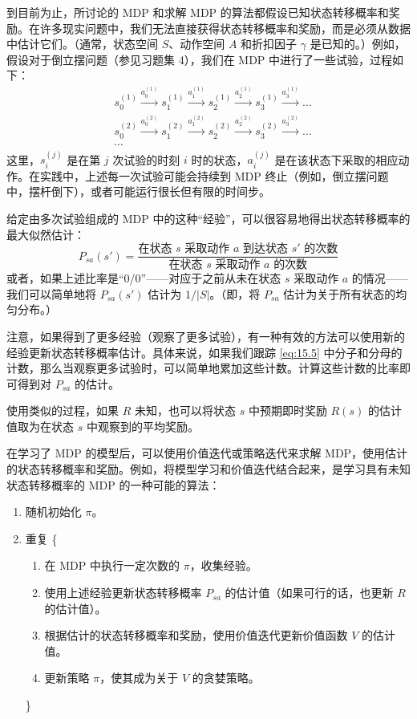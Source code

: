 到目前为止，所讨论的 MDP 和求解 MDP 的算法都假设已知状态转移概率和奖励。在许多现实问题中，我们无法直接获得状态转移概率和奖励，而是必须从数据中估计它们。（通常，状态空间 $S$、动作空间 $A$ 和折扣因子 $\gamma$ 是已知的。）例如，假设对于倒立摆问题（参见习题集 4），我们在 MDP 中进行了一些试验，过程如下：
\begin{align*}
    &s_0^{(1)} \xrightarrow{a_0^{(1)}} s_1^{(1)} \xrightarrow{a_1^{(1)}} s_2^{(1)} \xrightarrow{a_2^{(1)}} s_3^{(1)} \xrightarrow{a_3^{(1)}} \dots \\
    &s_0^{(2)} \xrightarrow{a_0^{(2)}} s_1^{(2)} \xrightarrow{a_1^{(2)}} s_2^{(2)} \xrightarrow{a_2^{(2)}} s_3^{(2)} \xrightarrow{a_3^{(2)}} \dots\\
    &\cdots
\end{align*}
这里，$s_i^{(j)}$ 是在第 $j$ 次试验的时刻 $i$ 时的状态，$a_i^{(j)}$ 是在该状态下采取的相应动作。在实践中，上述每一次试验可能会持续到 MDP 终止（例如，倒立摆问题中，摆杆倒下），或者可能运行很长但有限的时间步。

给定由多次试验组成的 MDP 中的这种“经验”，可以很容易地得出状态转移概率的最大似然估计：
\begin{equation}
    P_{sa}(s') = \frac{\text{在状态 $s$ 采取动作 $a$ 到达状态 $s'$ 的次数}}{\text{在状态 $s$ 采取动作 $a$ 的次数}}
    \label{eq:15.5}
\end{equation}
或者，如果上述比率是“0/0”——对应于之前从未在状态 $s$ 采取动作 $a$ 的情况——我们可以简单地将 $P_{sa}(s')$ 估计为 $1/|S|$。（即，将 $P_{sa}$ 估计为关于所有状态的均匀分布。）

注意，如果得到了更多经验（观察了更多试验），有一种有效的方法可以使用新的经验更新状态转移概率估计。具体来说，如果我们跟踪 \eqref{eq:15.5} 中分子和分母的计数，那么当观察更多试验时，可以简单地累加这些计数。计算这些计数的比率即可得到对 $P_{sa}$ 的估计。

使用类似的过程，如果 $R$ 未知，也可以将状态 $s$ 中预期即时奖励 $R(s)$ 的估计值取为在状态 $s$ 中观察到的平均奖励。

在学习了 MDP 的模型后，可以使用价值迭代或策略迭代来求解 MDP，使用估计的状态转移概率和奖励。例如，将模型学习和价值迭代结合起来，是学习具有未知状态转移概率的 MDP 的一种可能的算法：

\begin{enumerate}
    \item 随机初始化 $\pi$。
    \item 重复 \{
        \begin{enumerate}
            \item 在 MDP 中执行一定次数的 $\pi$，收集经验。
            \item 使用上述经验更新状态转移概率 $P_{sa}$ 的估计值（如果可行的话，也更新 $R$ 的估计值）。
            \item 根据估计的状态转移概率和奖励，使用价值迭代更新价值函数 $V$ 的估计值。
            \item 更新策略 $\pi$，使其成为关于 $V$ 的贪婪策略。
        \end{enumerate}
    \}
\end{enumerate}

